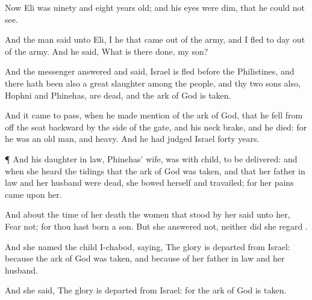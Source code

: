 {Now
Eli was
ninety and
eight
years
old; and his
eyes were
dim, that he
could not
see.

And the
man
said unto
Eli, I
{} he that
came out of the
army, and I
fled to
day out of the
army. And he
said, What is there
done, my
son?

And the
messenger
answered and
said,
Israel is
fled
before the
Philistines, and there hath been also a
great
slaughter among the
people, and thy
two
sons also,
Hophni and
Phinehas, are
dead, and the
ark of
God is
taken.

And it came to pass, when he made
mention of the
ark of
God, that he
fell from off the
seat
backward
by the
side of the
gate, and his
neck
brake, and he
died: for he was an
old
man, and
heavy. And he had
judged
Israel
forty
years.


\par }{\PP {}¶ And his daughter in
law,
Phinehas’
wife, was with
child,
{} to be
delivered: and when she
heard the
tidings
that the
ark of
God was
taken, and that her father in
law and her
husband were
dead, she
bowed herself and
travailed; for her
pains
came upon her.

And about the
time of her
death the women that
stood by her
said unto her,
Fear not; for thou hast
born a
son. But she
answered not, neither did she
regard
{}.

And she
named the
child
I-chabod,
saying, The
glory is
departed from
Israel:
because the
ark of
God was
taken, and because of her father in
law and her
husband.

And she
said, The
glory is
departed from
Israel: for the
ark of
God is
taken.




\par }
